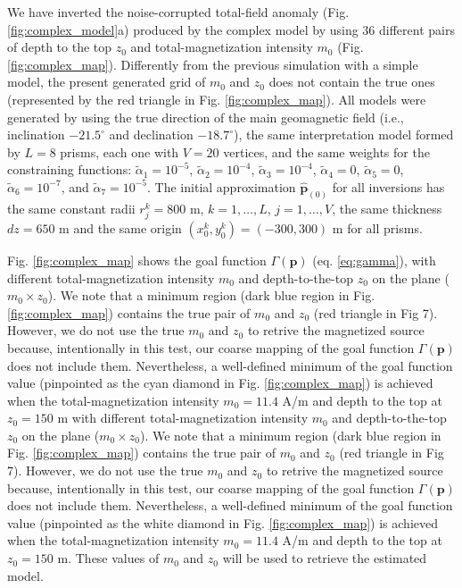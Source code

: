 We have inverted the noise-corrupted total-field anomaly (Fig. \ref{fig:complex_model}a) produced by the complex model by using 36 different pairs of depth to the top $ z_0 $ and total-magnetization intensity $ m_0 $ (Fig. \ref{fig:complex_map}). Differently from the previous simulation with a simple model, the present generated grid of $ m_0 $ and $ z_0 $ does not contain the true ones (represented by the red triangle in Fig. \ref{fig:complex_map}). All models were generated by using the true direction of the main geomagnetic field (i.e., inclination $ -21.5^\circ $ and declination $ -18.7^\circ $), the same interpretation model formed by $ L = 8 $ prisms, each one with $ V = 20 $ vertices, and the same weights for the constraining functions: $\tilde{\alpha}_1 = 10^{-5}$, $\tilde{\alpha}_2 = 10^{-4}$, $\tilde{\alpha}_3 = 10^{-4}$, $\tilde{\alpha}_4 = 0$, $\tilde{\alpha}_5 = 0$, $\tilde{\alpha}_6 = 10^{-7}$, and $\tilde{\alpha}_7 = 10^{-5}$. The initial approximation $ \hat{\mathbf{p}}_{(0)} $ for all inversions has the same constant radii $ r^k_j = 800 $ m, $ k = 1, \dots, L $, $ j = 1, \dots, V $, the same thickness $ dz = 650 $ m and the same origin $ (x^k_0, y^k_0) = (-300, 300) $ m for all prisms.

Fig. \ref{fig:complex_map} shows the goal function $ \Gamma(\mathbf{p}) $ (eq. \ref{eq:gamma}), with different total-magnetization intensity $ m_0 $ and depth-to-the-top $z_0$ on the plane ($ m_0 \times z_0 $). We note that a minimum region (dark blue region in Fig. \ref{fig:complex_map}) contains the true pair of $ m_0 $ and  $ z_0 $  (red triangle  in Fig 7). However, we do not use the true  $ m_0 $ and $ z_0 $ to retrive the magnetized source because, intentionally in this test, our coarse mapping of the goal function $ \Gamma(\mathbf{p}) $ does not  include them.  Nevertheless, a well-defined minimum of the goal function value (pinpointed as the cyan diamond in Fig. \ref{fig:complex_map}) is achieved when the total-magnetization intensity $ m_0 = 11.4 $ A/m and depth to the top at $  z_0 = 150 $ m with different total-magnetization intensity $ m_0 $ and depth-to-the-top $z_0$ on the plane ($ m_0 \times z_0 $). We note that a minimum region (dark blue region in Fig. \ref{fig:complex_map}) contains the true pair of $ m_0 $ and  $ z_0 $  (red triangle  in Fig 7). However, we do not use the true  $ m_0 $ and $ z_0 $ to retrive the magnetized source because, intentionally in this test, our coarse mapping of the goal function $ \Gamma(\mathbf{p}) $ does not  include them.  Nevertheless, a well-defined minimum of the goal function value (pinpointed as the white diamond in Fig. \ref{fig:complex_map}) is achieved when the total-magnetization intensity $ m_0 = 11.4 $ A/m and depth to the top at $  z_0 = 150 $ m. These values of $ m_0 $ and $ z_0 $ will be used to retrieve the estimated model.

